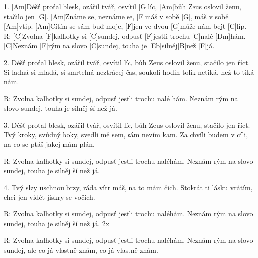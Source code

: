 
1. [Am]Déšť proťal blesk, ozářil tvář, osvítil [G]líc,
[Am]bůh Zeus oslovil ženu, stačilo jen [G].
[Am]Známe se, neznáme se, [F]máš v sobě [G], máš v sobě [Am]vtip.
[Am]Cítím se sám buď moje, [F]jen ve dvou [G]může nám bejt [C]líp.
R: [C]Zvolna [F]kalhotky si [C]sundej, odpusť [F]jestli trochu [C]nalé [Dm]hám.
[C]Neznám [F]rým na slovo [C]sundej, touha je [Eb]silněj[B] než [F]já.

2. Déšť proťal blesk, ozářil tvář, osvítil  líc,
bůh Zeus oslovil ženu, stačilo jen  říct.
Si ladná si mladá, si smrtelná  neztrácej  čas,
soukolí hodin tolik  netiká, než to tiká  nám.

R: Zvolna  kalhotky si  sundej, odpusť  jestli trochu  nalé  hám.
Neznám  rým na slovo  sundej, touha je  silněj  ší než  já.

3. Déšť proťal blesk, ozářil tvář, osvítil  líc,
bůh Zeus oslovil ženu, stačilo jen  říct.
Tvý kroky, svůdný boky,  svedli mě  sem, sám nevím kam.
Za chvíli budem v cíli,  na co se ptáš jakej mám plán.

R: Zvolna kalhotky si sundej, odpusť jestli trochu naléhám.
Neznám rým na slovo sundej, touha je silněj ší než já.

4. Tvý slzy uschnou brzy, ráda vítr máš, na to mám čich.
Stokrát ti lásku vrátím, chci jen vidět jiskry se vočích.

R: Zvolna kalhotky si sundej, odpusť jestli trochu naléhám.
Neznám rým na slovo sundej, touha je silněj ší než já. 2x

R: Zvolna kalhotky si sundej, odpusť jestli trochu naléhám.
Neznám rým na slovo sundej, ale co já vlastně znám, co já vlastně znám. 

